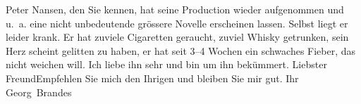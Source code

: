 \begin{ledgroupsized}[t]{13cm}
           \pstart
           Peter Nansen, den Sie kennen, hat seine
                    Production wieder aufgenommen und u. a. eine nicht unbedeutende grössere Novelle erscheinen lassen.
                    Selbst liegt er leider krank. Er hat zuviele {\pb}Cigaretten geraucht, zuviel
                    Whisky getrunken, sein Herz scheint gelitten zu haben, er hat seit 3–4 Wochen
                        ein
               schwaches Fieber, das nicht weichen
                    will. Ich liebe ihn sehr und bin um ihn bekümmert.\pend
           \pstart
           Liebster Freund\hspace*{1.5em}Empfehlen Sie mich den Ihrigen
                    und bleiben Sie mir gut.\pend
           \pstart Ihr \spacefill\mbox{Georg Brandes}\pend{}\endnumbering{}\end{ledgroupsized}  \newcommand{\dateiname}{L02221}\newcommand{\titel}{Georg Brandes an Arthur Schnitzler, 4. 12. 1915}\newcommand{\editorInnen}{Martin Anton Müller und Gerd-Hermann Susen}
      